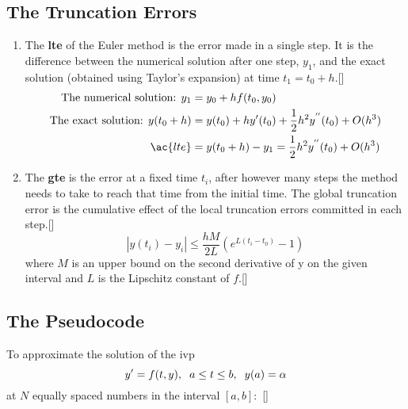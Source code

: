 \documentclass[12pt,oneside]{book}
\begin{document}
\begin{spacing}{1.2}
			\subsection*{The Truncation Errors}
				\begin{enumerate}
					\item The \textbf{\ac{lte}} of the Euler method is the error made in a single step. It is the difference between the numerical solution after one step, $y_{1}$, and the exact solution (obtained using Taylor's expansion) at time $t_{1} = t_{0} + h$.[]
					\begin{equation*}
						\begin{split}
							\text{The numerical solution: } y_{1} & = y_{0} + hf(t_{0}, y_{0}) \\
							\text{The exact solution: } y(t_{0} + h) & = y(t_{0}) + hy'(t_{0}) + \frac{1}{2}h^2y^{''}(t_{0}) + O(h^{3}) \\
							\ac{lte} & = y(t_{0} + h) - y_{1} = \frac{1}{2}h^2y^{''}(t_{0}) + O(h^{3})
						\end{split}
					\end{equation*}
					
					\item The \textbf{\ac{gte}} is the error at a fixed time $t_{i}$, after however many steps the method needs to take to reach that time from the initial time. The global truncation error is the cumulative effect of the local truncation errors committed in each step.[]
					\begin{equation*}
						|y(t_{i}) - y_{i}| \leq \frac{hM}{2L} (e^{L(t_{i} - t_{0})} - 1)
					\end{equation*}
					where $ M $ is an upper bound on the second derivative of y on the given interval and $ L $ is the Lipschitz constant of $ f $.[]
				\end{enumerate}
			
			\subsection{The Pseudocode}
				To approximate the solution of the \ac{ivp}
				\[ y' = f(t,y), \hspace*{0.2cm} a \leq t \leq b, \hspace*{0.2cm} y(a) = \alpha \]
				at $ N $ equally spaced numbers in the interval $ [a, b]: $ []
				

\end{spacing}
\end{document}
